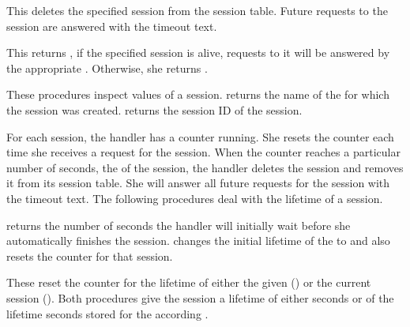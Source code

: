 \begin{desc}
  This deletes the specified session from the session table.  Future
  requests to the session are answered with the timeout text.
\end{desc}

\begin{desc}
  This returns \sharpt, if the specified session is alive, \ie
  requests to it will be answered by the appropriate \surflet.
  Otherwise, she returns \sharpf.
\end{desc}

\begin{desc}
  These procedures inspect values of a session.
   returns the name of the \surflet for which
  the session was created.   returns the
  session ID of the session. 
\end{desc}

For each session, the \surflet handler has a counter running.  She
resets the counter each time she receives a request for the session.
When the counter reaches a particular number of seconds, the
 of the session, the \surflet handler deletes the
session and removes it from its session table.  She will answer all
future requests for the session with the timeout text.  The following
procedures deal with the lifetime of a session.

\begin{desc}
   returns the number of seconds the \surflet
  handler will initially wait before she automatically finishes the
  session.   changes the initial lifetime of
  the  to  and also resets the counter
  for that session.
\end{desc}

\begin{desc}
  These reset the counter for the lifetime of either the given
   () or the current session
  ().  Both procedures give the session a lifetime
  of either  seconds or of the lifetime seconds stored
  for the according .
\end{desc}

